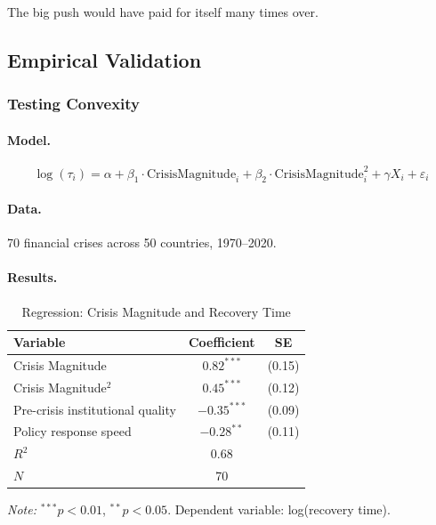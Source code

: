 The big push would have paid for itself many times over.

\subsection{Empirical Validation}

\subsubsection{Testing Convexity}

\paragraph{Model.}
\begin{equation}
\log(\tau_i) = \alpha + \beta_1 \cdot \text{CrisisMagnitude}_i + \beta_2 \cdot \text{CrisisMagnitude}_i^2 + \gamma X_i + \varepsilon_i
\end{equation}

\paragraph{Data.}
70 financial crises across 50 countries, 1970--2020.

\paragraph{Results.}
\begin{table}[htbp]
\centering
\caption{Regression: Crisis Magnitude and Recovery Time}
\label{tab:convexity-regression}
\begin{tabular}{@{}lcc@{}}
\toprule
\textbf{Variable} & \textbf{Coefficient} & \textbf{SE} \\
\midrule
Crisis Magnitude & $0.82^{***}$ & (0.15) \\
Crisis Magnitude$^2$ & $0.45^{***}$ & (0.12) \\
Pre-crisis institutional quality & $-0.35^{***}$ & (0.09) \\
Policy response speed & $-0.28^{**}$ & (0.11) \\
\midrule
$R^2$ & 0.68 & \\
$N$ & 70 & \\
\bottomrule
\end{tabular}
\begin{flushleft}
\small\textit{Note:} $^{***}p<0.01$, $^{**}p<0.05$. Dependent variable: log(recovery time).
\end{flushleft}
\end{table}


